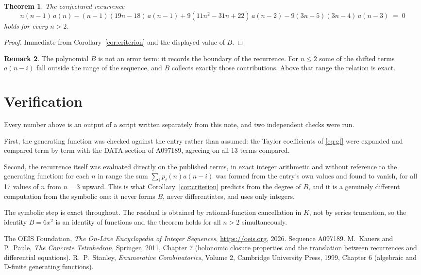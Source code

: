 \documentclass[11pt,a4paper]{article}
\theoremstyle{plain}
\newtheorem{theorem}{Theorem}
\theoremstyle{definition}
\newtheorem{remark}[theorem]{Remark}
\begin{document}
\begin{theorem}
The conjectured recurrence
\[
n \left(n - 1\right)\,a(n) -  \left(n - 1\right) \left(19 n - 18\right)\,a(n-1) + 9 \left(11 n^{2} - 31 n + 22\right)\,a(n-2) -  9 \left(3 n - 5\right) \left(3 n - 4\right)\,a(n-3) \;=\;0
\]
holds for every $n>2$.
\end{theorem}

\begin{proof}
Immediate from Corollary~\ref{cor:criterion} and the displayed value of $B$.
\end{proof}

\begin{remark}
The polynomial $B$ is not an error term: it records the boundary of the recurrence. For
$n\le2$ some of the shifted terms $a(n-i)$ fall outside the range of the sequence,
and $B$ collects exactly those contributions. Above that range the relation is exact.
\end{remark}

\section{Verification}

Every number above is an output of a script written separately from this note, and two
independent checks were run.

First, the generating function was checked against the entry rather than assumed: the
Taylor coefficients of \eqref{eq:gf} were expanded and compared term by term with the DATA
section of A097189, agreeing on all 13 terms compared.

Second, the recurrence itself was evaluated directly on the published terms, in exact
integer arithmetic and without reference to the generating function: for each $n$ in range
the sum $\sum_{i}p_{i}(n)a(n-i)$ was formed from the entry's own values and found to
vanish, for all 17 values of $n$ from $n=3$ upward. This is what
Corollary~\ref{cor:criterion} predicts from the degree of $B$, and it is a genuinely
different computation from the symbolic one: it never forms $B$, never differentiates, and
uses only integers.

The symbolic step is exact throughout. The residual is obtained by rational-function
cancellation in $K$, not by series truncation, so the identity $B=6 x^{2}$ is an
identity of functions and the theorem holds for all $n>2$ simultaneously.

\begin{thebibliography}{9}
 The OEIS Foundation, \emph{The On-Line Encyclopedia of Integer Sequences},
\url{https://oeis.org}, 2026. Sequence A097189.
 M.~Kauers and P.~Paule, \emph{The Concrete Tetrahedron}, Springer, 2011,
Chapter 7 (holonomic closure properties and the translation between recurrences and
differential equations).
 R.~P.~Stanley, \emph{Enumerative Combinatorics}, Volume 2, Cambridge
University Press, 1999, Chapter 6 (algebraic and D-finite generating functions).
\end{thebibliography}
\end{document}
